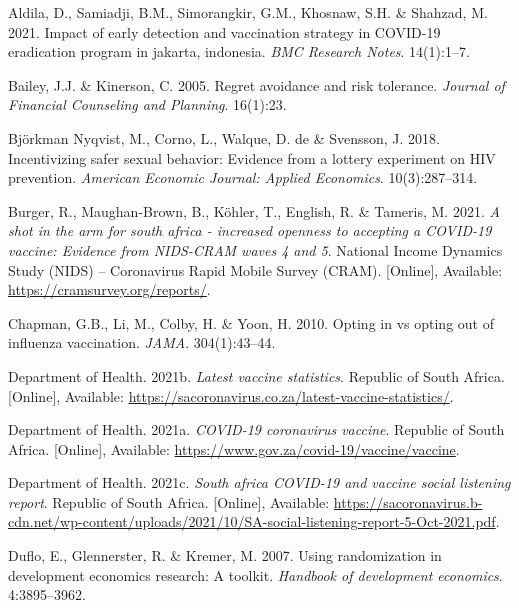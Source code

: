 \documentclass[11pt,preprint, authoryear]{elsarticle}
\numberwithin{equation}{section}
\numberwithin{figure}{section}
\numberwithin{table}{section}
\newlength{\cslhangindent}
\newenvironment{CSLReferences}%
  {\setlength{\parindent}{0pt}%
  \everypar{\setlength{\hangindent}{\cslhangindent}}\ignorespaces}%
  {\par}
\begin{document}
\hypertarget{refs}{}
\begin{CSLReferences}{1}{0}
\leavevmode\hypertarget{ref-erad}{}%
Aldila, D., Samiadji, B.M., Simorangkir, G.M., Khosnaw, S.H. \& Shahzad,
M. 2021. Impact of early detection and vaccination strategy in COVID-19
eradication program in jakarta, indonesia. \emph{BMC Research Notes}.
14(1):1--7.

\leavevmode\hypertarget{ref-regret}{}%
Bailey, J.J. \& Kinerson, C. 2005. Regret avoidance and risk tolerance.
\emph{Journal of Financial Counseling and Planning}. 16(1):23.

\leavevmode\hypertarget{ref-hiv}{}%
Björkman Nyqvist, M., Corno, L., Walque, D. de \& Svensson, J. 2018.
Incentivizing safer sexual behavior: Evidence from a lottery experiment
on HIV prevention. \emph{American Economic Journal: Applied Economics}.
10(3):287--314.

\leavevmode\hypertarget{ref-cram}{}%
Burger, R., Maughan-Brown, B., Köhler, T., English, R. \& Tameris, M.
2021. \emph{A shot in the arm for south africa - increased openness to
accepting a COVID-19 vaccine: Evidence from NIDS-CRAM waves 4 and 5}.
National Income Dynamics Study (NIDS) -- Coronavirus Rapid Mobile Survey
(CRAM). {[}Online{]}, Available: \url{https://cramsurvey.org/reports/}.

\leavevmode\hypertarget{ref-opt}{}%
Chapman, G.B., Li, M., Colby, H. \& Yoon, H. 2010. Opting in vs opting
out of influenza vaccination. \emph{JAMA}. 304(1):43--44.

\leavevmode\hypertarget{ref-stat}{}%
Department of Health. 2021b. \emph{Latest vaccine statistics}. Republic
of South Africa. {[}Online{]}, Available:
\url{https://sacoronavirus.co.za/latest-vaccine-statistics/}.

\leavevmode\hypertarget{ref-herd}{}%
Department of Health. 2021a. \emph{COVID-19 coronavirus vaccine}.
Republic of South Africa. {[}Online{]}, Available:
\url{https://www.gov.za/covid-19/vaccine/vaccine}.

\leavevmode\hypertarget{ref-report}{}%
Department of Health. 2021c. \emph{South africa COVID-19 and vaccine
social listening report}. Republic of South Africa. {[}Online{]},
Available:
\url{https://sacoronavirus.b-cdn.net/wp-content/uploads/2021/10/SA-social-listening-report-5-Oct-2021.pdf}.

\leavevmode\hypertarget{ref-random}{}%
Duflo, E., Glennerster, R. \& Kremer, M. 2007. Using randomization in
development economics research: A toolkit. \emph{Handbook of development
economics}. 4:3895--3962.


\end{CSLReferences}
\end{document}
